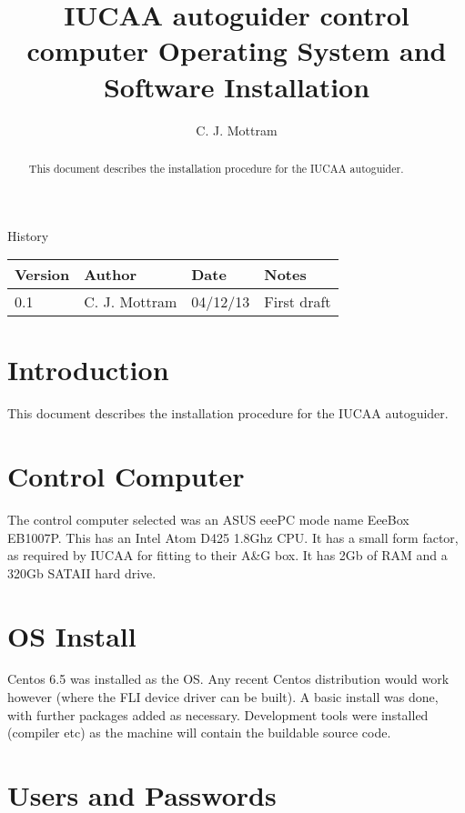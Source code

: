 \documentclass[10pt,a4paper]{article}
\title{IUCAA autoguider control computer Operating System and Software Installation}
\author{C. J. Mottram}
\date{}
\begin{document}
\thispagestyle{empty}
\maketitle
\begin{abstract}
This document describes the installation procedure for the IUCAA autoguider.
\end{abstract}
\centerline{\Large History}
\begin{center}
\begin{tabular}{|l|l|l|p{15em}|}
\hline
{\bf Version} & {\bf Author} & {\bf Date} & {\bf Notes} \\
\hline
0.1 & C. J. Mottram & 04/12/13 & First draft \\
\hline
\end{tabular}
\end{center}

\newpage
\tableofcontents
\listoffigures
\listoftables
\newpage

\newcommand{\mytilde}{\raise.17ex\hbox{$\scriptstyle\mathtt{\sim}$}}

\section{Introduction}
This document describes the installation procedure for the IUCAA autoguider.

\section{Control Computer}

The control computer selected was an ASUS eeePC mode name EeeBox EB1007P. This has an Intel Atom D425 1.8Ghz CPU. It has a small form factor, as required by IUCAA for fitting to their A\&G box. It has 2Gb of RAM and a 320Gb SATAII hard drive.

\section{OS Install}
Centos 6.5 was installed as the OS. Any recent Centos distribution would work however (where the FLI device driver
can be built). A basic install was done, with further packages added as necessary. Development tools were installed (compiler etc) as the machine will contain the buildable source code.

\section{Users and Passwords}
\end{document}
